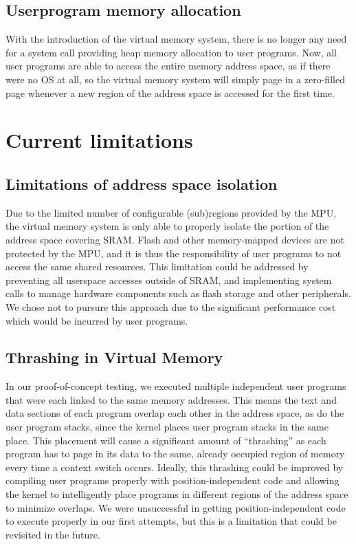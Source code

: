 \documentclass[12pt]{article}
\begin{document}
\subsection{Userprogram memory allocation}
With the introduction of the virtual memory system, there is no longer any need
for a system call providing heap memory allocation to user programs. Now, all
user programs are able to access the entire memory address space, as if there
were no OS at all, so the virtual memory system will simply page in a 
zero-filled page whenever a new region of the address space is accessed for the
first time.

\section{Current limitations}

\subsection{Limitations of address space isolation}
Due to the limited number of configurable (sub)regions provided by the MPU, the
virtual memory system is only able to properly isolate the portion of the
address space covering SRAM. Flash and other memory-mapped devices are not
protected by the MPU, and it is thus the responsibility of user programs to not
access the same shared resources. This limitation could be addressed by
preventing all userspace accesses outside of SRAM, and implementing system calls
to manage hardware components such as flash storage and other peripherals. We
chose not to pursure this approach due to the significant performance cost which
would be incurred by user programs.

\subsection{Thrashing in Virtual Memory}
In our proof-of-concept testing, we executed multiple independent user programs
that were each linked to the same memory addresses. This means the text and data
sections of each program overlap each other in the address space, as do the
user program stacks, since the kernel places user program stacks in the same 
place. This placement will cause a significant amount of
``thrashing'' as each program has to page in its data to the same, already
occupied region of memory every time a context switch occurs. Ideally, this
thrashing could be improved by compiling user programs properly with
position-independent code and allowing the kernel to intelligently place 
programs in different regions of the address space to minimize overlaps. We
were unsuccessful in getting position-independent code to execute properly in
our first attempts, but this is a limitation that could be revisited in the
future.
\end{document}
